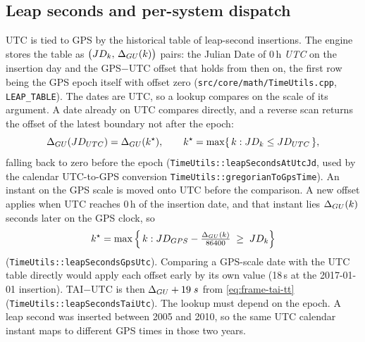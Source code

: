 \documentclass[main.tex]{subfiles}
\begin{document}
\subsection{Leap seconds and per-system dispatch}
\label{sec:frame-leap}

UTC is tied to GPS by the historical table of leap-second insertions.
The engine stores the table as $\big(JD_k,\,\Delta_{GU}(k)\big)$
pairs: the Julian Date of 0\,h \emph{UTC} on the insertion day and the
GPS$-$UTC offset that holds from then on, the first row being the GPS
epoch itself with offset zero
(\texttt{src/core/math/TimeUtils.cpp}, \texttt{LEAP\_TABLE}).  The
dates are UTC, so a lookup compares on the scale of its argument.  A
date already on UTC compares directly, and a reverse scan returns the
offset of the latest boundary not after the epoch:
\begin{equation}
\Delta_{GU}(JD_{UTC}) = \Delta_{GU}(k^{\star}),
\qquad
k^{\star} = \max\{\,k : JD_k \le JD_{UTC}\,\},
\label{eq:frame-leaplookup}
\end{equation}
falling back to zero before the epoch
(\texttt{TimeUtils::leapSecondsAtUtcJd}, used by the calendar UTC-to-GPS
conversion \texttt{TimeUtils::gregorianToGpsTime}).  An instant on the
GPS scale is moved onto UTC before the comparison.  A new offset applies
when UTC reaches 0\,h of the insertion date, and that instant lies
$\Delta_{GU}(k)$ seconds later on the GPS clock, so
\begin{equation}
k^{\star} = \max\Big\{\,k : JD_{GPS}
   - \tfrac{\Delta_{GU}(k)}{86400} \;\ge\; JD_k\Big\}
\label{eq:frame-leaplookup-gps}
\end{equation}
(\texttt{TimeUtils::leapSecondsGpsUtc}).  Comparing a GPS-scale date with
the UTC table directly would apply each offset early by its own value
(18\,s at the 2017-01-01 insertion).  TAI$-$UTC is then
$\Delta_{GU} + 19\;s$ from \eqref{eq:frame-tai-tt}
(\texttt{TimeUtils::leapSecondsTaiUtc}).  The lookup must depend on the
epoch.  A leap second was inserted between 2005 and 2010, so the same
UTC calendar instant maps to different GPS times in those two years.
\end{document}
